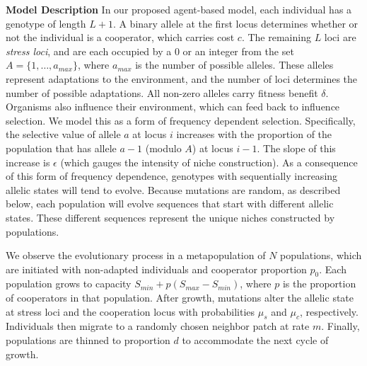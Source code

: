 \documentclass[10pt,]{article}
\begin{document}
\textbf{Model Description}  In our proposed agent-based model, each individual
has a genotype of length \(L+1\). A binary allele at the first locus determines
whether or not the individual is a cooperator, which carries cost \(c\). The
remaining \(L\) loci are \emph{stress loci}, and are each occupied by a \(0\)
or an integer from the set \(A=\{1, \ldots, a_{max}\}\), where \(a_{max}\) is
the number of possible alleles. These alleles represent adaptations to the
environment, and the number of loci determines the number of possible
adaptations. All non-zero alleles carry fitness benefit \(\delta\).  Organisms
also influence their environment, which can feed back to influence selection.
We model this as a form of frequency dependent selection.  Specifically, the
selective value of allele $a$ at locus $i$ increases with the proportion of the
population that has allele $a-1$ (modulo $A$) at locus $i-1$.  The slope of
this increase is $\epsilon$ (which gauges the intensity of niche construction).
As a consequence of this form of frequency dependence, genotypes with
sequentially increasing allelic states will tend to evolve.  Because mutations
are random, as described below, each population will evolve sequences that
start with different allelic states. These different sequences represent the
unique niches constructed by populations.

We observe the evolutionary process in a metapopulation of \(N\)
populations, which are initiated with non-adapted individuals and
cooperator proportion \(p_0\). Each population grows to capacity
\(S_{min} + p (S_{max} - S_{min})\), where \(p\) is the proportion of
cooperators in that population. After growth, mutations alter the
allelic state at stress loci and the cooperation locus with
probabilities \(\mu_{s}\) and \(\mu_{c}\), respectively. Individuals
then migrate to a randomly chosen neighbor patch at rate \(m\). Finally,
populations are thinned to proportion \(d\) to accommodate the next
cycle of growth.
\end{document}
